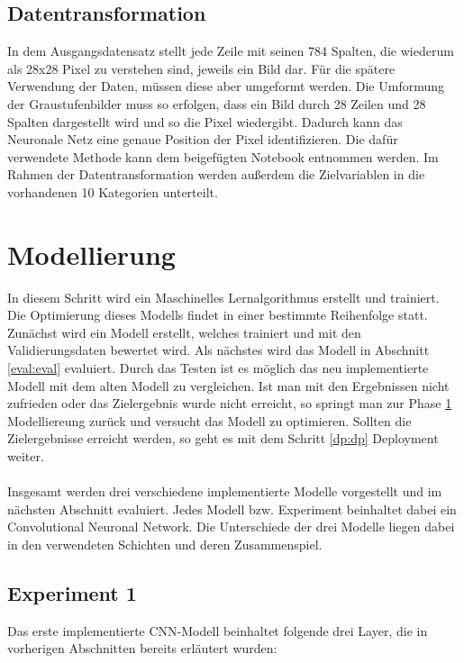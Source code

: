 \documentclass[12pt]{scrreprt}
\begin{document}
\subsection{Datentransformation}
	
In dem Ausgangsdatensatz stellt jede Zeile mit seinen 784 Spalten, die wiederum als 28x28 Pixel zu verstehen sind, jeweils ein Bild dar. Für die spätere Verwendung der Daten, müssen diese aber umgeformt werden. Die Umformung der Graustufenbilder muss so erfolgen, dass ein Bild durch 28 Zeilen und 28 Spalten dargestellt wird und so die Pixel wiedergibt. Dadurch kann das Neuronale Netz eine genaue Position der Pixel identifizieren. Die dafür verwendete Methode kann dem beigefügten Notebook entnommen werden. Im Rahmen der Datentransformation werden außerdem die Zielvariablen in die vorhandenen 10 Kategorien unterteilt.
	
\section{Modellierung}\label{model:model}
	
In diesem Schritt wird ein Maschinelles Lernalgorithmus erstellt und trainiert. Die Optimierung dieses Modells findet in einer bestimmte Reihenfolge statt. Zunächst wird ein Modell erstellt, welches trainiert und mit den Validierungsdaten bewertet wird. Als nächstes wird das Modell in Abschnitt \ref{eval:eval} evaluiert. Durch das Testen ist es möglich das neu implementierte Modell mit dem alten Modell zu vergleichen. Ist man mit den Ergebnissen nicht zufrieden oder das Zielergebnis wurde nicht erreicht, so springt man zur Phase \ref{model:model} Modelliereung zurück und versucht das Modell zu optimieren. Sollten die Zielergebnisse erreicht werden, so geht es mit dem Schritt \ref{dp:dp} Deployment weiter.\\
\\
Insgesamt werden drei verschiedene implementierte Modelle vorgestellt und im nächsten Abschnitt evaluiert. Jedes Modell bzw. Experiment beinhaltet dabei ein Convolutional Neuronal Network. Die Unterschiede der drei Modelle liegen dabei in den verwendeten Schichten und deren Zusammenspiel. 
	
\subsection{Experiment 1}\label{model:ep1}
	
Das erste implementierte CNN-Modell beinhaltet folgende drei Layer, die in vorherigen Abschnitten bereits erläutert wurden:
	
\end{document}
